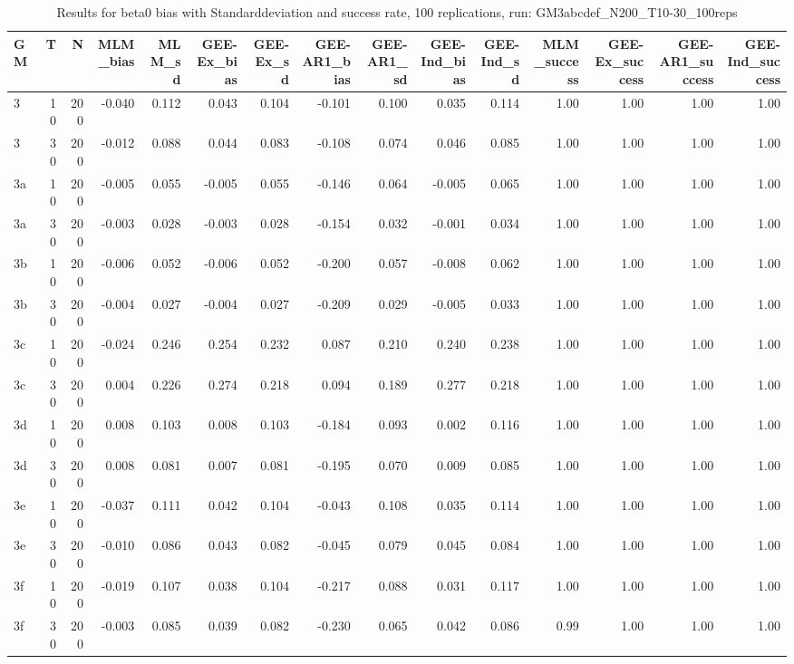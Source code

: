 \begin{table}[ht]
\centering
\begin{tabular}{lrrrrrrrrrrrrrr}
  \hline
GM & T & N & MLM\_bias & MLM\_sd & GEE-Ex\_bias & GEE-Ex\_sd & GEE-AR1\_bias & GEE-AR1\_sd & GEE-Ind\_bias & GEE-Ind\_sd & MLM\_success & GEE-Ex\_success & GEE-AR1\_success & GEE-Ind\_success \\ 
  \hline
3 & 10 & 200 & -0.040 & 0.112 & 0.043 & 0.104 & -0.101 & 0.100 & 0.035 & 0.114 & 1.00 & 1.00 & 1.00 & 1.00 \\ 
  3 & 30 & 200 & -0.012 & 0.088 & 0.044 & 0.083 & -0.108 & 0.074 & 0.046 & 0.085 & 1.00 & 1.00 & 1.00 & 1.00 \\ 
  3a & 10 & 200 & -0.005 & 0.055 & -0.005 & 0.055 & -0.146 & 0.064 & -0.005 & 0.065 & 1.00 & 1.00 & 1.00 & 1.00 \\ 
  3a & 30 & 200 & -0.003 & 0.028 & -0.003 & 0.028 & -0.154 & 0.032 & -0.001 & 0.034 & 1.00 & 1.00 & 1.00 & 1.00 \\ 
  3b & 10 & 200 & -0.006 & 0.052 & -0.006 & 0.052 & -0.200 & 0.057 & -0.008 & 0.062 & 1.00 & 1.00 & 1.00 & 1.00 \\ 
  3b & 30 & 200 & -0.004 & 0.027 & -0.004 & 0.027 & -0.209 & 0.029 & -0.005 & 0.033 & 1.00 & 1.00 & 1.00 & 1.00 \\ 
  3c & 10 & 200 & -0.024 & 0.246 & 0.254 & 0.232 & 0.087 & 0.210 & 0.240 & 0.238 & 1.00 & 1.00 & 1.00 & 1.00 \\ 
  3c & 30 & 200 & 0.004 & 0.226 & 0.274 & 0.218 & 0.094 & 0.189 & 0.277 & 0.218 & 1.00 & 1.00 & 1.00 & 1.00 \\ 
  3d & 10 & 200 & 0.008 & 0.103 & 0.008 & 0.103 & -0.184 & 0.093 & 0.002 & 0.116 & 1.00 & 1.00 & 1.00 & 1.00 \\ 
  3d & 30 & 200 & 0.008 & 0.081 & 0.007 & 0.081 & -0.195 & 0.070 & 0.009 & 0.085 & 1.00 & 1.00 & 1.00 & 1.00 \\ 
  3e & 10 & 200 & -0.037 & 0.111 & 0.042 & 0.104 & -0.043 & 0.108 & 0.035 & 0.114 & 1.00 & 1.00 & 1.00 & 1.00 \\ 
  3e & 30 & 200 & -0.010 & 0.086 & 0.043 & 0.082 & -0.045 & 0.079 & 0.045 & 0.084 & 1.00 & 1.00 & 1.00 & 1.00 \\ 
  3f & 10 & 200 & -0.019 & 0.107 & 0.038 & 0.104 & -0.217 & 0.088 & 0.031 & 0.117 & 1.00 & 1.00 & 1.00 & 1.00 \\ 
  3f & 30 & 200 & -0.003 & 0.085 & 0.039 & 0.082 & -0.230 & 0.065 & 0.042 & 0.086 & 0.99 & 1.00 & 1.00 & 1.00 \\ 
   \hline
\end{tabular}
\caption{Results for beta0 bias with Standarddeviation and success rate, 100 replications, run: GM3abcdef_N200_T10-30_100reps} 
\label{tab:beta0_bias_sd_success}
\end{table}
